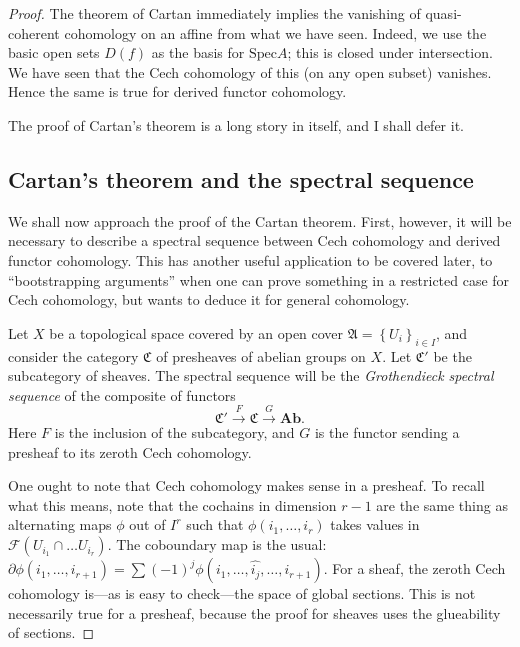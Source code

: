 \documentclass{article}
\begin{document}
\begin{proof}
The theorem of Cartan immediately implies the vanishing of quasi-coherent
cohomology on an affine from what we have seen. Indeed, we use the basic open
sets $D(f)$ as the basis for $\mathrm{Spec} A$; this is closed under intersection. We
have seen that the Cech cohomology of this (on any open subset) vanishes. Hence
the same is true for derived functor cohomology.

The proof of Cartan's theorem is a long story in itself, and I shall defer it.

\subsection{Cartan's theorem and the spectral sequence} We shall now approach
the proof of the Cartan theorem. First, however, it will be necessary to
describe a spectral sequence between Cech cohomology and derived functor
cohomology. This has another useful application to be covered later, to
``bootstrapping arguments'' when one can prove something in a restricted case
for Cech cohomology, but wants to deduce it for general cohomology.



Let $X$ be a topological space covered by an open cover $\mathfrak{A} =
\left\{U_i\right\}_{i \in I}$, and consider the category $\mathfrak{C}$ of
presheaves of abelian groups on $X$. Let $\mathfrak{C}'$ be the subcategory of sheaves.
The spectral sequence will be the \emph{Grothendieck spectral sequence} of the
composite of functors
\[ \mathfrak{C}' \stackrel{F}{\to} \mathfrak{C} \stackrel{G}{\to} \mathbf{Ab}. \]
Here $F$ is the inclusion of the subcategory, and $G$ is the functor sending a
presheaf to its zeroth Cech cohomology.

\begin{comment}
The first thing to note is that the functor
\[ \mathcal{F} \to \mathcal{F}(U),  \mathfrak{C} \to \mathbf{Ab} \]
is an exact functor as we are working with \emph{presheaves}. For presheaves,
exactness can be checked on open sets instead of stalks. 

Let $\mathfrak{D}$ be the category of abelian groups. 
We have a functor that sends a presheaf $\mathcal{F}$ to its zeroth Cech
cohomology. \end{comment}

One ought to note that Cech cohomology makes sense in a presheaf. To recall
what this means, note that the cochains in dimension $r-1$ are the same thing
as alternating maps $\phi$ out of $I^r$ 
such that $\phi(i_1, \dots, i_r)$ takes values in $\mathcal{F}(U_{i_1} \cap
\dots U_{i_r})$. 
The coboundary map is the usual: $\partial \phi(i_1, \dots, i_{r+1}) = \sum
(-1)^j \phi(i_1, \dots, \hat{i_j}, \dots, i_{r+1}).$
For a sheaf, the zeroth Cech cohomology is---as is easy to check---the space of
global sections. This is not necessarily true for a presheaf, because the proof
for sheaves uses the glueability of sections. 



\end{proof}
\end{document}
